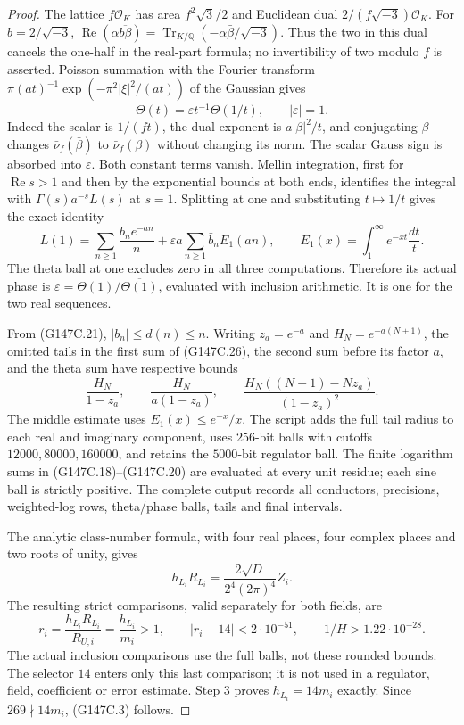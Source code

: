 \begin{proof}
The lattice $f\mathcal O_K$ has area $f^2\sqrt3/2$ and
Euclidean dual $2/(f\sqrt{-3})\mathcal O_K$.
For $b=2/\sqrt{-3}$,
$\operatorname{Re}(\alpha\overline{b\beta})
 =\operatorname{Tr}_{K/\mathbb Q}(-\alpha\bar\beta/\sqrt{-3})$.
Thus the two in this dual cancels the one-half in the real-part
formula; no invertibility of two modulo $f$ is asserted.
Poisson summation with the Fourier transform
$\pi(at)^{-1}\exp(-\pi^2|\xi|^2/(at))$ of the Gaussian gives
\[
 \Theta(t)=\varepsilon t^{-1}\overline{\Theta(1/t)},
          \qquad |\varepsilon|=1.
 \tag{G147C.25}
\]
Indeed the scalar is $1/(ft)$, the dual exponent is
$a|\beta|^2/t$, and conjugating $\beta$ changes
$\bar\nu_f(\bar\beta)$ to $\bar\nu_f(\beta)$ without changing
its norm.  The scalar Gauss sign is absorbed into $\varepsilon$.
Both constant terms vanish.  Mellin integration, first for
$\operatorname{Re}s>1$ and then by the exponential bounds at both
ends, identifies the integral with $\Gamma(s)a^{-s}L(s)$ at $s=1$.
Splitting at one and substituting $t\mapsto1/t$ gives the exact identity
\[
 L(1)=\sum_{n\ge1}\frac{b_ne^{-an}}n
       +\varepsilon a\sum_{n\ge1}\bar b_n E_1(an),
 \qquad E_1(x)=\int_1^\infty e^{-xt}\frac{dt}{t}.
 \tag{G147C.26}
\]
The theta ball at one excludes zero in all three computations.
Therefore its actual phase is
$\varepsilon=\Theta(1)/\overline{\Theta(1)}$, evaluated with
inclusion arithmetic.  It is one for the two real sequences.

From (G147C.21), $|b_n|\le d(n)\le n$.
Writing $z_a=e^{-a}$ and $H_N=e^{-a(N+1)}$, the omitted tails
in the first sum of (G147C.26), the second sum before its factor
$a$, and the theta sum have respective bounds
\[
 \frac{H_N}{1-z_a},\qquad \frac{H_N}{a(1-z_a)},\qquad
 \frac{H_N((N+1)-Nz_a)}{(1-z_a)^2}.
 \tag{G147C.27}
\]
The middle estimate uses $E_1(x)\le e^{-x}/x$.
The script adds the full tail radius to each real and imaginary
component, uses $256$-bit balls with cutoffs $12000,80000,160000$,
and retains the $5000$-bit regulator ball.
The finite logarithm sums in (G147C.18)--(G147C.20) are evaluated
at every unit residue; each sine ball is strictly positive.
The complete output records all conductors, precisions, weighted-log
rows, theta/phase balls, tails and final intervals.

The analytic class-number formula, with four real places,
four complex places and two roots of unity, gives
\[
 h_{L_i}R_{L_i}=\frac{2\sqrt D}{2^4(2\pi)^4}Z_i.
 \tag{G147C.28}
\]
The resulting strict comparisons, valid separately for both fields, are
\[
 r_i=\frac{h_{L_i}R_{L_i}}{R_{U,i}}=\frac{h_{L_i}}{m_i}>1,
 \qquad |r_i-14|<2\cdot10^{-51},\qquad 1/H>1.22\cdot10^{-28}.
 \tag{G147C.29}
\]
The actual inclusion comparisons use the full balls, not these rounded
bounds.  The selector $14$ enters only this last comparison; it is
not used in a regulator, field, coefficient or error estimate.
Step 3 proves $h_{L_i}=14m_i$ exactly.
Since $269\nmid14m_i$, (G147C.3) follows.


\end{proof}
